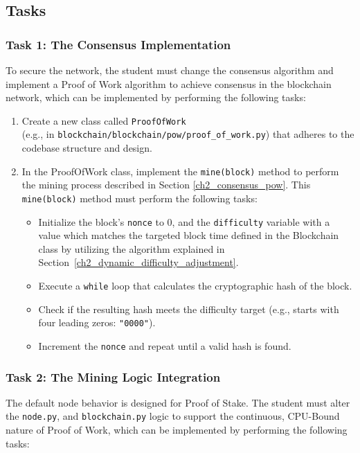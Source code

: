 \newpage

\subsection{Tasks}

\subsubsection*{Task 1: The Consensus Implementation}
To secure the network, the student must change the consensus algorithm and implement a Proof of Work algorithm to achieve consensus in the blockchain network, which can be implemented by performing the following tasks:
\begin{enumerate}
    \item Create a new class called \texttt{ProofOfWork}\\ (e.g., in \texttt{blockchain/blockchain/pow/proof\_of\_work.py}) that adheres to the codebase structure and design.
    \item In the ProofOfWork class, implement the \texttt{mine(block)} method to perform the mining process described in Section \ref{ch2_consensus_pow}. This \texttt{mine(block)} method must perform the following tasks:
    \begin{itemize}
        \item Initialize the block's \texttt{nonce} to 0, and the \texttt{difficulty} variable with a value which matches the targeted block time defined in the Blockchain class by utilizing the algorithm explained in Section~\ref{ch2_dynamic_difficulty_adjustment}.
        \item Execute a \texttt{while} loop that calculates the cryptographic hash of the block.
        \item Check if the resulting hash meets the difficulty target (e.g., starts with four leading zeros: \texttt{"0000"}).
        \item Increment the \texttt{nonce} and repeat until a valid hash is found.
    \end{itemize}
\end{enumerate}
\subsubsection*{Task 2: The Mining Logic Integration} 
The default node behavior is designed for Proof of Stake. The student must alter the \texttt{node.py}, and \texttt{blockchain.py} logic to support the continuous, CPU-Bound nature of Proof of Work, which can be implemented by performing the following tasks:

